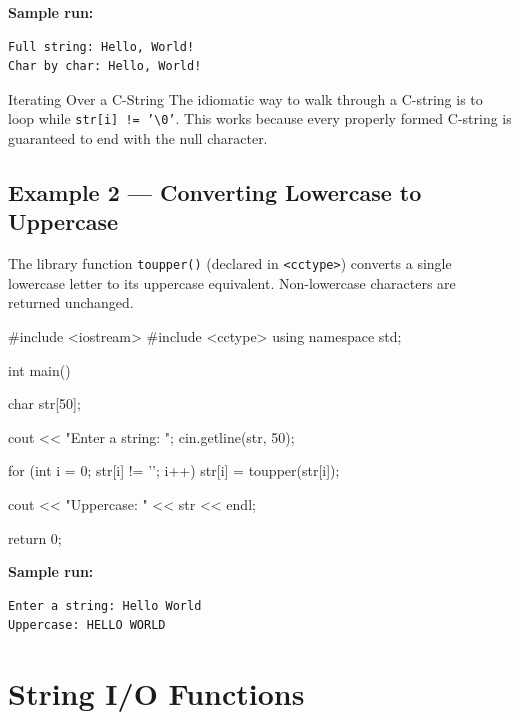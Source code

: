\noindent
\textbf{Sample run:}
\begin{verbatim}
Full string: Hello, World!
Char by char: Hello, World!
\end{verbatim}

\begin{conceptbox}{Iterating Over a C-String}
The idiomatic way to walk through a C-string is to loop while
\texttt{str[i] != '\textbackslash 0'}.  This works because every
properly formed C-string is guaranteed to end with the null character.
\end{conceptbox}

\subsection{Example 2 --- Converting Lowercase to Uppercase}

The library function \texttt{toupper()} (declared in
\texttt{<cctype>}) converts a single lowercase letter to its uppercase
equivalent.  Non-lowercase characters are returned unchanged.

\begin{cppcode}
#include <iostream>
#include <cctype>
using namespace std;

int main() {
    char str[50];

    cout << "Enter a string: ";
    cin.getline(str, 50);

    for (int i = 0; str[i] != '\0'; i++) {
        str[i] = toupper(str[i]);
    }

    cout << "Uppercase: " << str << endl;

    return 0;
}
\end{cppcode}

\noindent
\textbf{Sample run:}
\begin{verbatim}
Enter a string: Hello World
Uppercase: HELLO WORLD
\end{verbatim}

\section{String I/O Functions}
\label{sec:strings-io}

